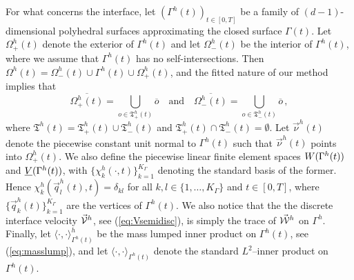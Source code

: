 For what concerns the interface, let $(\Gamma^h(t))_{t\in[0,T]}$  be a family of
$(d-1)$-dimensional polyhedral surfaces approximating the closed surface
$\Gamma(t)$. Let $\Omega^h_+(t)$ denote the exterior of $\Gamma^h(t)$ and let
$\Omega^h_-(t)$ be the interior of $\Gamma^h(t)$, where we assume that
$\Gamma^h(t)$ has no self-intersections. Then $\Omega^h(t) = \Omega_-^h(t) \cup
\Gamma^h(t) \cup \Omega_+^h(t)$, and the fitted nature of our method implies
that
\begin{equation} \label{eq:fittedO_ale}
\overline{\Omega^h_+(t)} = \bigcup_{o \in \mathfrak{T}^h_+(t)} \overline{o}
\quad\text{and}\quad
\overline{\Omega^h_-(t)} = \bigcup_{o \in \mathfrak{T}^h_-(t)} \overline{o} \,,
\end{equation}
where $\mathfrak{T}^h(t) = \mathfrak{T}^h_+(t) \cup \mathfrak{T}^h_-(t)$ and
$\mathfrak{T}^h_+(t) \cap \mathfrak{T}^h_-(t) = \emptyset$.
Let $\vec \nu^h(t)$ denote the piecewise constant unit normal to $\Gamma^h(t)$
such that $\vec\nu^h(t)$ points into $\Omega^h_+(t)$. We also define the
piecewise linear finite element spaces $W(\Gamma^h(t))$ and $\underline{V}(\Gamma^h(t))$, with
$\{\chi^h_k(\cdot,t)\}_{k=1}^{K_\Gamma}$ denoting the standard basis of the
former. Hence $\chi^h_k(\vec q^h_l(t),t) = \delta_{kl}$ for all
$k,l \in \{1,\ldots,K_\Gamma\}$ and $t \in [0,T]$, where
$\{\vec q^h_k(t)\}_{k=1}^{K_\Gamma}$ are the vertices of $\Gamma^h(t)$. We also
notice that the the discrete interface velocity $\vec{\mathcal{V}}^h$, see
(\ref{eq:Vsemidisc}), is simply the trace of $\vec{\mathcal W}^h$ on $\Gamma^h$. Finally, let
$\langle\cdot,\cdot\rangle_{\Gamma^h(t)}^h$ be the mass lumped inner product on
$\Gamma^h(t)$, see (\ref{eq:masslump}), and let
$\langle\cdot,\cdot\rangle_{\Gamma^h(t)}$ denote the standard $L^2$--inner
product on $\Gamma^h(t)$.


